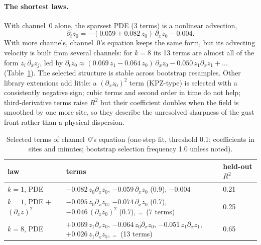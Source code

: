 \documentclass[11pt]{article}
\newcommand{\dx}{\partial_x}
\begin{document}
\paragraph{The shortest laws.} With channel~0 alone, the sparsest PDE (3 terms) is a nonlinear advection,
\begin{equation}
\partial_t z_0 = -(0.059 + 0.082\, z_0)\, \dx z_0 - 0.004 .
\label{eq:adv}
\end{equation}
With more channels, channel~0's equation keeps the same form, but its advecting velocity is built from several channels: for $k = 8$ its 13 terms are almost all of the form $z_i\, \dx z_j$, led by
$\partial_t z_0 \approx (0.069\, z_1 - 0.064\, z_0)\, \dx z_0 - 0.050\, z_1 \dx z_1 + \dots$ (Table~\ref{tab:terms}). The selected structure is stable across bootstrap resamples. Other library extensions add little: a $(\dx z_0)^2$ term (KPZ-type) is selected with a consistently negative sign; cubic terms and second order in time do not help; third-derivative terms raise $R^2$ but their coefficient doubles when the field is smoothed by one more site, so they describe the unresolved sharpness of the gust front rather than a physical dispersion.

\begin{table}[htbp]\centering\small
\caption{Selected terms of channel~0's equation (one-step fit, threshold 0.1; coefficients in sites and minutes; bootstrap selection frequency 1.0 unless noted).}\label{tab:terms}
\begin{tabular}{lll}\toprule
law & terms & held-out $R^2$\\\midrule
$k=1$, PDE & $-0.082\, z_0\dx z_0$, $-0.059\, \dx z_0$ (0.9), $-0.004$ & 0.21\\
$k=1$, PDE + $(\dx z)^2$ & $-0.095\, z_0\dx z_0$, $-0.074\,\dx z_0$ (0.7), $-0.046\,(\dx z_0)^2$ (0.7), \dots\ (7 terms) & 0.25\\
$k=8$, PDE & $+0.069\, z_1\dx z_0$, $-0.064\, z_0\dx z_0$, $-0.051\, z_1\dx z_1$, $+0.026\, z_1 \dx z_5$, \dots\ (13 terms) & 0.65\\\bottomrule
\end{tabular}
\end{table}
\end{document}
